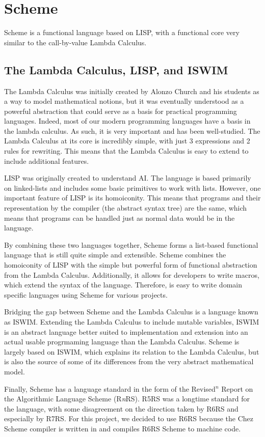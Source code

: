 \section{Scheme}
Scheme is a functional language based on LISP, with a functional core very similar to the call-by-value Lambda Calculus.
\subsection{The Lambda Calculus, LISP, and ISWIM}
The Lambda Calculus was initially created by Alonzo Church and his students as a way to model mathematical notions, but it was eventually understood as a powerful abstraction that could serve as a basis for practical programming languages. Indeed, most of our modern programming languages have a basis in the lambda calculus. As such, it is very important and has been well-studied. The Lambda Calculus at its core is incredibly simple, with just 3 expressions and 2 rules for rewriting. This means that the Lambda Calculus is easy to extend to include additional features.

LISP was originally created to understand AI. The language is based primarily on linked-lists and includes some basic primitives to work with lists. However, one important feature of LISP is its homoiconity. This means that programs and their representation by the compiler (the abstract syntax tree) are the same, which means that programs can be handled just as normal data would be in the language.

By combining these two languages together, Scheme forms a list-based functional language that is still quite simple and extensible. Scheme combines the homoiconity of LISP with the simple but powerful form of functional abstraction from the Lambda Calculus. Additionally, it allows for developers to write macros, which extend the syntax of the language. Therefore, is easy to write domain specific languages using Scheme for various projects. 

Bridging the gap between Scheme and the Lambda Calculus is a language known as ISWIM. Extending the Lambda Calculus to include mutable variables, ISWIM is an abstract language better suited to implementation and extension into an actual usable progrmaming language than the Lambda Calculus. Scheme is largely based on ISWIM, which explains its relation to the Lambda Calculus, but is also the source of some of its differences from the very abstract mathematical model.

Finally, Scheme has a language standard in the form of the Revised$^n$ Report on the Algorithmic Language Scheme (R\textit{n}RS). R5RS was a longtime standard for the language, with some disagreement on the direction taken by R6RS and especially by R7RS. For this project, we decided to use R6RS because the Chez Scheme compiler is written in and compiles R6RS Scheme to machine code.
